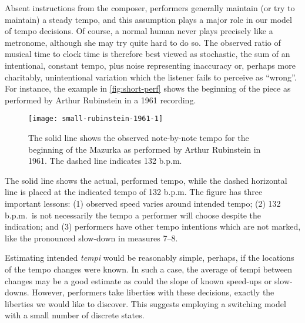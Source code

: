 \documentclass[12pt]{article}
\begin{document}
Absent instructions from the composer, performers generally maintain
(or try to maintain) a steady tempo, and this assumption plays a major
role in our model of tempo decisions. Of course, a normal human 
never plays precisely like a 
metronome, although she may try quite hard to do so. The observed
ratio of musical time to clock time
is therefore best viewed as stochastic, the sum of an
intentional, constant tempo, plus noise representing inaccuracy
or, perhaps more charitably, unintentional variation which the
listener fails to perceive as ``wrong''. For instance, the example in
\autoref{fig:short-perf} shows the beginning of the piece as performed
by Arthur Rubinstein in a 1961 recording. 
\begin{figure}[t!]
 \centering
 \texttt{[image: small-rubinstein-1961-1]}
 \caption{The solid line shows the observed note-by-note tempo for
   the beginning of the Mazurka as performed by Arthur Rubinstein in
   1961. The dashed line indicates 132 b.p.m.}
 \label{fig:short-perf}
\end{figure}
The solid line shows the
actual, performed tempo, while the dashed horizontal line is placed at
the indicated tempo of 132 b.p.m. The figure has three important
lessons: (1) observed speed varies around intended tempo; (2) 132 b.p.m.\ is
not necessarily the tempo a performer will choose despite the
indication; and (3) performers have other tempo intentions which are
not marked, like the pronounced slow-down in measures 7--8.

Estimating intended {\em tempi} would be reasonably simple, perhaps, 
if the locations of the tempo changes were known. In such a case,
the average of tempi between changes may be a good estimate as
could the slope of known speed-ups or slow-downs. However, performers
take liberties with these decisions, exactly the liberties we would
like to discover. This suggests employing a switching model with a
small number of discrete states.
\end{document}
